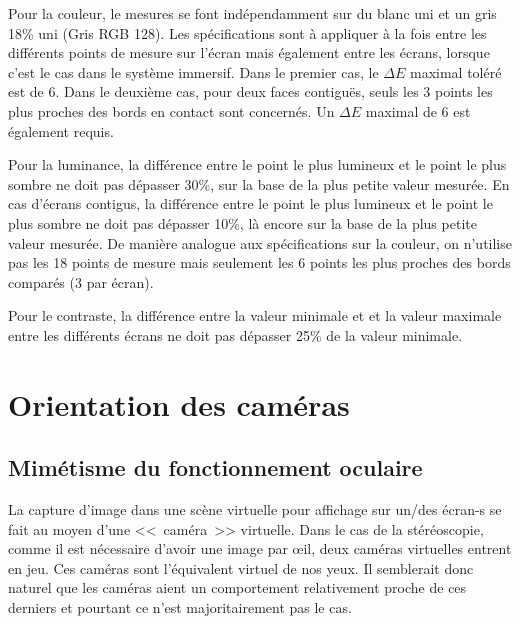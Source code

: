 	\par Pour la couleur, le mesures se font indépendamment sur du blanc uni et un gris 18\% uni (Gris RGB 128). Les spécifications sont à appliquer à la fois entre les différents points de mesure sur l'écran mais également entre les écrans, lorsque c'est le cas dans le système immersif. Dans le premier cas, le $\Delta E$ maximal toléré est de 6. Dans le deuxième cas, pour deux faces contiguës, seuls les 3 points les plus proches des bords en contact sont concernés. Un $\Delta E$ maximal de 6 est également requis.
	
	\par Pour la luminance, la différence entre le point le plus lumineux et le point le plus sombre ne doit pas dépasser 30\%, sur la base de la plus petite valeur mesurée. En cas d'écrans contigus, la différence entre le point le plus lumineux et le point le plus sombre ne doit pas dépasser 10\%, là encore sur la base de la plus petite valeur mesurée. De manière analogue aux spécifications sur la couleur, on n'utilise pas les 18 points de mesure mais seulement les 6 points les plus proches des bords comparés (3 par écran).
	
	\par Pour le contraste, la différence entre la valeur minimale et et la valeur maximale entre les différents écrans ne doit pas dépasser 25\% de la valeur minimale.
	
	\section{Orientation des caméras}	
	\subsection{Mimétisme du fonctionnement oculaire}	
	\par La capture d'image dans une scène virtuelle pour affichage sur un/des écran-s se fait au moyen d'une <<~caméra~>> virtuelle. Dans le cas de la stéréoscopie, comme il est nécessaire d'avoir une image par œil, deux caméras virtuelles entrent en jeu. Ces caméras sont l'équivalent virtuel de nos yeux. Il semblerait donc naturel que les caméras aient un comportement relativement proche de ces derniers et pourtant ce n'est majoritairement pas le cas.
	

